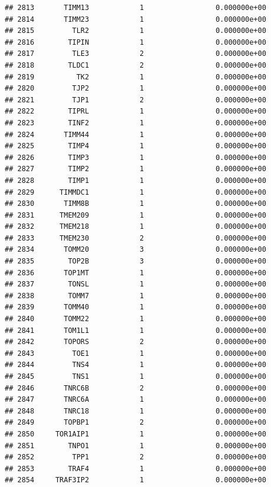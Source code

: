 \documentclass[
]{article}
\begin{document}
\begin{verbatim}
## 2813       TIMM13            1                 0.000000e+00
## 2814       TIMM23            1                 0.000000e+00
## 2815         TLR2            1                 0.000000e+00
## 2816        TIPIN            1                 0.000000e+00
## 2817         TLE3            2                 0.000000e+00
## 2818        TLDC1            2                 0.000000e+00
## 2819          TK2            1                 0.000000e+00
## 2820         TJP2            1                 0.000000e+00
## 2821         TJP1            2                 0.000000e+00
## 2822        TIPRL            1                 0.000000e+00
## 2823        TINF2            1                 0.000000e+00
## 2824       TIMM44            1                 0.000000e+00
## 2825        TIMP4            1                 0.000000e+00
## 2826        TIMP3            1                 0.000000e+00
## 2827        TIMP2            1                 0.000000e+00
## 2828        TIMP1            1                 0.000000e+00
## 2829      TIMMDC1            1                 0.000000e+00
## 2830       TIMM8B            1                 0.000000e+00
## 2831      TMEM209            1                 0.000000e+00
## 2832      TMEM218            1                 0.000000e+00
## 2833      TMEM230            2                 0.000000e+00
## 2834       TOMM20            3                 0.000000e+00
## 2835        TOP2B            3                 0.000000e+00
## 2836       TOP1MT            1                 0.000000e+00
## 2837        TONSL            1                 0.000000e+00
## 2838        TOMM7            1                 0.000000e+00
## 2839       TOMM40            1                 0.000000e+00
## 2840       TOMM22            1                 0.000000e+00
## 2841       TOM1L1            1                 0.000000e+00
## 2842       TOPORS            2                 0.000000e+00
## 2843         TOE1            1                 0.000000e+00
## 2844         TNS4            1                 0.000000e+00
## 2845         TNS1            1                 0.000000e+00
## 2846       TNRC6B            2                 0.000000e+00
## 2847       TNRC6A            1                 0.000000e+00
## 2848       TNRC18            1                 0.000000e+00
## 2849       TOPBP1            2                 0.000000e+00
## 2850     TOR1AIP1            1                 0.000000e+00
## 2851        TNPO1            1                 0.000000e+00
## 2852         TPP1            2                 0.000000e+00
## 2853        TRAF4            1                 0.000000e+00
## 2854     TRAF3IP2            1                 0.000000e+00

\end{verbatim}
\end{document}
